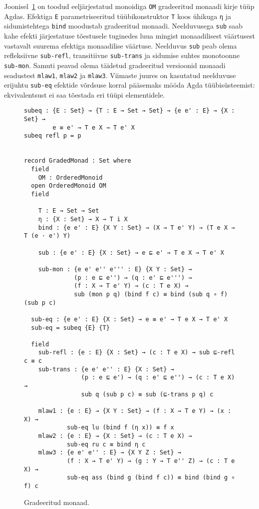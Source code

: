 \documentclass[a4paper,12pt]{article}
\begin{document}
Joonisel~\ref{fig:graded-monad} on toodud eeljärjestatud monoidiga {\tt OM} gradeeritud monaadi kirje tüüp Agdas.
Efektiga {\tt E} parametriseeritud tüübikonstruktor {\tt T} koos ühikuga {\tt η} ja sidumistehtega {\tt bind} moodustab gradeeritud monaadi.
Neelduvusega {\tt sub} saab kahe efekti järjestatuse tõestusele tuginedes luua mingist monaadilisest väärtusest vastavalt suurema efektiga monaadilise väärtuse.
Neelduvus {\tt sub} peab olema refleksiivne {\tt sub-refl}, transitiivne {\tt sub-trans} ja  sidumise suhtes monotoonne {\tt sub-mon}.
Samuti peavad olema täidetud gradeeritud versioonid monaadi seadustest {\tt mlaw1}, {\tt mlaw2} ja {\tt mlaw3}. Viimaste juures on kasutatud neelduvuse erijuhtu {\tt sub-eq} efektide võrdsuse korral pääsemaks mööda Agda tüübisüsteemist: ekvivalentsust ei saa tõestada eri tüüpi elementidele.

\begin{figure}
  \begin{BVerbatim}
subeq : {E : Set} → {T : E → Set → Set} → {e e' : E} → {X : Set} →
        e ≡ e' → T e X → T e' X
subeq refl p = p


record GradedMonad : Set where
  field
    OM : OrderedMonoid
  open OrderedMonoid OM
  field

    T : E → Set → Set
    η : {X : Set} → X → T i X
    bind : {e e' : E} {X Y : Set} → (X → T e' Y) → (T e X → T (e · e') Y)

    sub : {e e' : E} {X : Set} → e ⊑ e' → T e X → T e' X

    sub-mon : {e e' e'' e''' : E} {X Y : Set} →
              (p : e ⊑ e'') → (q : e' ⊑ e''') → 
              (f : X → T e' Y) → (c : T e X) → 
              sub (mon p q) (bind f c) ≡ bind (sub q ∘ f) (sub p c) 

  sub-eq : {e e' : E} {X : Set} → e ≡ e' → T e X → T e' X
  sub-eq = subeq {E} {T}
 
  field
    sub-refl : {e : E} {X : Set} → (c : T e X) → sub ⊑-refl c ≡ c
    sub-trans : {e e' e'' : E} {X : Set} →
                (p : e ⊑ e') → (q : e' ⊑ e'') → (c : T e X) → 
                sub q (sub p c) ≡ sub (⊑-trans p q) c   

    mlaw1 : {e : E} → {X Y : Set} → (f : X → T e Y) → (x : X) →
            sub-eq lu (bind f (η x)) ≡ f x
    mlaw2 : {e : E} → {X : Set} → (c : T e X) →
            sub-eq ru c ≡ bind η c
    mlaw3 : {e e' e'' : E} → {X Y Z : Set} →
            (f : X → T e' Y) → (g : Y → T e'' Z) → (c : T e X) → 
            sub-eq ass (bind g (bind f c)) ≡ bind (bind g ∘ f) c 
  \end{BVerbatim}
  \caption{Gradeeritud monaad.}
  \label{fig:graded-monad}
\end{figure}
\end{document}
